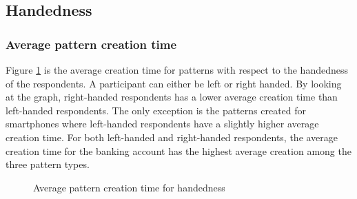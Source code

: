 	\subsection{Handedness}\label{sec:subgroupHandedness}

    \subsubsection{Average pattern creation time}
    Figure \ref{fig:avgcreationtimehandedness} is the average creation time for patterns with respect to the handedness of the respondents. A participant can either be left or right handed. By looking at the graph, right-handed respondents has a lower average creation time than left-handed respondents. The only exception is the patterns created for smartphones where left-handed respondents have a slightly higher average creation time. For both left-handed and right-handed respondents, the average creation time for the banking account has the highest average creation among the three pattern types.  

      \begin{figure}[H]
        \centering
        \caption{Average pattern creation time for handedness}
        \label{fig:avgcreationtimehandedness}
      \end{figure}

